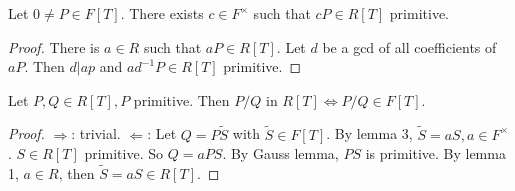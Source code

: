 \begin{lemma}
    Let $0\ne P\in F[T].$ There exists $c\in F^{\times}$ such that $cP\in R[T]$ primitive.
\end{lemma}
\begin{proof}
There is $a\in R$ such that $aP\in R[T].$ Let $d$ be a gcd of all coefficients of $aP$. Then $d|ap$ and $ad^{-1}P\in R[T]$ primitive.
\end{proof}
\begin{lemma}
Let $P,Q\in R[T],P$ primitive. Then $P/Q$ in $R[T]\iff P/Q\in F[T]$.
\end{lemma}
\begin{proof}
$\Longrightarrow$: trivial.
$\Longleftarrow$: Let $Q=P\tilde{S}$ with $\tilde{S}\in F[T]$. By lemma 3, $\tilde{S}=aS,a\in F^{\times}$. $S\in R[T]$ primitive. So $Q=aPS$. By Gauss lemma, $PS$ is primitive. By lemma 1, $a\in R$, then $\tilde{S}=aS\in R[T].$
\end{proof}
